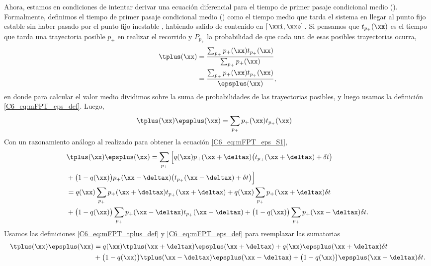 {Ahora, estamos en condiciones de intentar derivar una ecuación diferencial para el tiempo de primer pasaje condicional medio \tplus(\xx). Formalmente, definimos el tiempo de primer pasaje condicional medio \tplus(\xx) como el tiempo medio que tarda el sistema en llegar al punto fijo estable \xxe sin haber pasado por el punto fijo inestable \xxi, habiendo salido de \xx contenido en $[ \,\xxi,\xxe ]\,$. Si pensamos que $t_{p_{+}}(\xx)$ es el tiempo que tarda una trayectoria posible $p_{+}$ en realizar el recorrido y $P_{p_{+}}$ la probabilidad de que cada una de esas posibles trayectorias ocurra,
\begin{align}
    \tplus(\xx) &= \frac{\sum_{p_{+}}p_{+}(\xx) t_{p_{+}}(\xx)}{\sum_{p_{+}}p_{+}(\xx)}\\
    & = \frac{\sum_{p_{+}}p_{+}(\xx) t_{p_{+}}(\xx)}{\epsplus(\xx)},
\end{align}
en donde para calcular el valor medio dividimos sobre la suma de probabilidades de las trayectorias posibles, y luego usamos la definición \ref{C6_eq:mFPT_eps_def}. Luego,
\begin{align}
    \tplus(\xx) \epsplus(\xx)  &= \sum_{p_{+}}p_{+}(\xx) t_{p_{+}}(\xx) 
    \label{C6_eq:mFPT_tplus_def}
\end{align}
Con un razonamiento análogo al realizado para obtener la ecuación \ref{C6_eq:mFPT_eps_S1}, 
\begin{align}
   & \tplus(\xx) \epsplus(\xx) = \sum_{p_{+}} \Big[ q(\xx)  p_{+}(\xx + \deltax ) \big( t_{p_{+}}(\xx + \deltax) + \delta t \big)  \nonumber \\ & + \big( 1 - q(\xx) \big)  p_{+}(\xx - \deltax ) \big( t_{p_{+}}(\xx - \deltax) + \delta t \big)\Big] \\
   & =  q(\xx) \sum_{p_{+}} p_{+}(\xx + \deltax ) t_{p_{+}}(\xx + \deltax) + q(\xx) \sum_{p_{+}} p_{+}(\xx + \deltax ) \delta t  \nonumber \\ & + \big( 1 - q(\xx) \big) \sum_{p_{+}}p_{+}(\xx - \deltax ) t_{p_{+}}(\xx - \deltax) +  \big( 1 - q(\xx) \big) \sum_{p_{+}}p_{+}(\xx - \deltax ) \delta t .
\end{align}
Usamos las definiciones \ref{C6_eq:mFPT_tplus_def} y \ref{C6_eq:mFPT_eps_def} para reemplazar las sumatorias
\begin{align}
   \tplus(\xx) \epsplus(\xx) & = q(\xx) \tplus(\xx + \deltax) \epsplus(\xx + \deltax) + q(\xx) \epsplus(\xx + \deltax) \delta t \nonumber \\ & + \big( 1 - q(\xx) \big) \tplus(\xx - \deltax) \epsplus(\xx - \deltax) +  \big( 1 - q(\xx) \big) \epsplus(\xx - \deltax) \delta t.

\end{align}}
